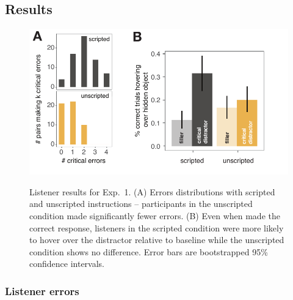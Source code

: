 \documentclass[manuscript]{stjour}
\begin{document}
\subsection{Results}

 \begin{figure}[t!]
 \begin{center}
 \vspace{-.25cm}
 \includegraphics[scale=1]{figures/Exp1_listener_results.pdf}
 \vspace{-.5cm}
 \caption{Listener results for Exp.~1. (A) Errors distributions with scripted and unscripted instructions -- participants in the unscripted condition made significantly fewer errors. (B) Even when made the correct response, listeners in the scripted condition were more likely to hover over the distractor relative to baseline while the unscripted condition shows no difference. Error bars are bootstrapped 95\% confidence intervals.}
 \vspace{-.5cm}
 \label{fig:exp1listener}
 \end{center}
 \end{figure}

\subsubsection{Listener errors}
\end{document}
